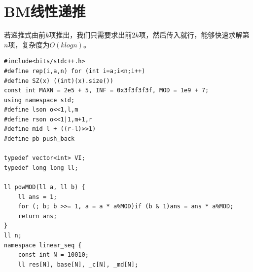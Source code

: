 \documentclass[a4paper,11pt,twoside,fontset = fandol,UTF8]{ctexbook} %
\begin{document}
	\section{BM线性递推}
	若递推式由前$k$项推出，我们只需要求出前$2k$项，然后传入就行，能够快速求解第$n$项，复杂度为$O(klogn)$。
	\begin{lstlisting}
#include<bits/stdc++.h>
#define rep(i,a,n) for (int i=a;i<n;i++)
#define SZ(x) ((int)(x).size())
const int MAXN = 2e5 + 5, INF = 0x3f3f3f3f, MOD = 1e9 + 7;
using namespace std;
#define lson o<<1,l,m
#define rson o<<1|1,m+1,r
#define mid l + ((r-l)>>1)
#define pb push_back
 
typedef vector<int> VI;
typedef long long ll;
 
ll powMOD(ll a, ll b) {
    ll ans = 1;
    for (; b; b >>= 1, a = a * a%MOD)if (b & 1)ans = ans * a%MOD;
    return ans;
}
ll n;
namespace linear_seq {
    const int N = 10010;
    ll res[N], base[N], _c[N], _md[N];
 

\end{lstlisting}
\end{document}
